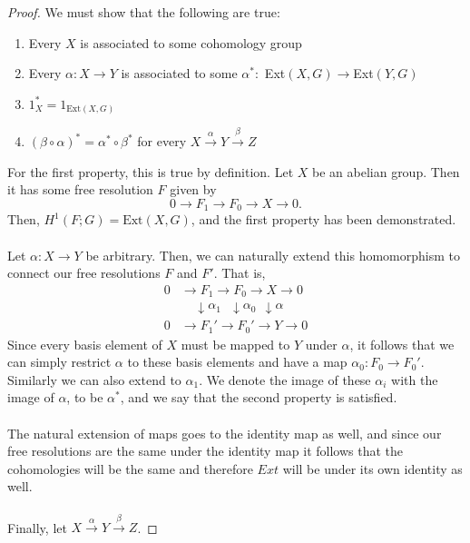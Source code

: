 \documentclass{article}
\theoremstyle{definition}
\begin{document}
    \begin{proof}
        We must show that the following are true:
        \begin{enumerate}
            \item Every $X$ is associated to some cohomology group
            \item Every $\alpha : X \rightarrow Y$ is associated to some $\alpha^* :$ Ext$(X,G) \rightarrow $Ext$(Y,G)$
            \item $1_X^* = 1_{\text{Ext}(X,G)}$ 
            \item $(\beta \circ \alpha)^* = \alpha^* \circ \beta^*$ for every $X \xrightarrow{\alpha} Y \xrightarrow{\beta} Z$
        \end{enumerate}
        For the first property, this is true by definition.
        Let $X$ be an abelian group. Then it has some free resolution $F$ given by
        \[
            0 \to F_1 \to F_0 \to X \to 0   
        .\]
        Then, $H^1(F;G) = \text{Ext}(X,G)$, and the first property has been demonstrated.
        \\\\
        Let $\alpha : X \rightarrow Y$ be arbitrary.
        Then, we can naturally extend this homomorphism to connect our 
        free resolutions $F$ and $F'$. That is,
        \begin{align*}
            0 &\to F_1 \to F_0 \to X \to 0 \\
            & \ \ \ \ \ \downarrow\alpha_1 \ \ \ \downarrow\alpha_0 \ \ \downarrow\alpha \\
            0 &\to F_1' \to F_0' \to Y \to 0
        \end{align*}
        Since every basis element of $X$ must be mapped to $Y$ under $\alpha$,
        it follows that we can simply restrict $\alpha$ to these basis elements and have a
        map $\alpha_0 : F_0 \to F_0'$. Similarly we can also extend to $\alpha_1$.
        We denote the image of these $\alpha_i$ with the image of $\alpha$, to be 
        $\alpha^*$, and we say that the second property is satisfied.
        \\\\
        The natural extension of maps goes to the identity map as well,
        and since our free resolutions are the same under the identity map it follows 
        that the cohomologies will be the same and therefore $Ext$ will 
        be under its own identity as well.
        \\\\
        Finally, let $X \xrightarrow{\alpha} Y \xrightarrow{\beta} Z$.

\end{proof}
\end{document}
